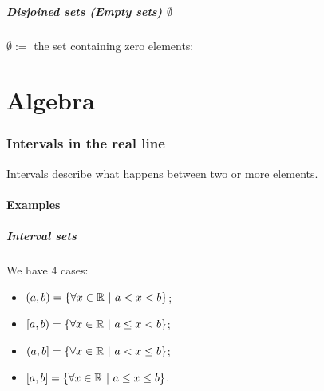 \documentclass{article}
\begin{document}
\newpage
\subsubsection{Disjoined sets (Empty sets) $\emptyset$}
$\emptyset :=$ the set containing zero elements:

\begin{figure}[ht!]
    \begin{center}
    \end{center}
\end{figure}

\newpage
\part{Algebra}
\section{Intervals in the real line}
Intervals describe what happens between two or more elements.

\subsection{Examples}
\subsubsection{Interval sets}
We have 4 cases:
\begin{itemize}
    \item $(a,b) = \left\{\forall x \in \mathbb{R} \ |\  a<x<b\right\}$;
    \item $\left[a,b\right) = \left\{\forall x \in \mathbb{R} \ |\  a\leq x<b\right\}$;
    \item $\left(a,b\right] = \left\{\forall x \in \mathbb{R} \ |\  a<x\leq b\right\}$;
    \item $\left[a,b\right] = \left\{\forall x \in \mathbb{R} \ |\  a\leq x\leq b\right\}$.
\end{itemize}
\end{document}
